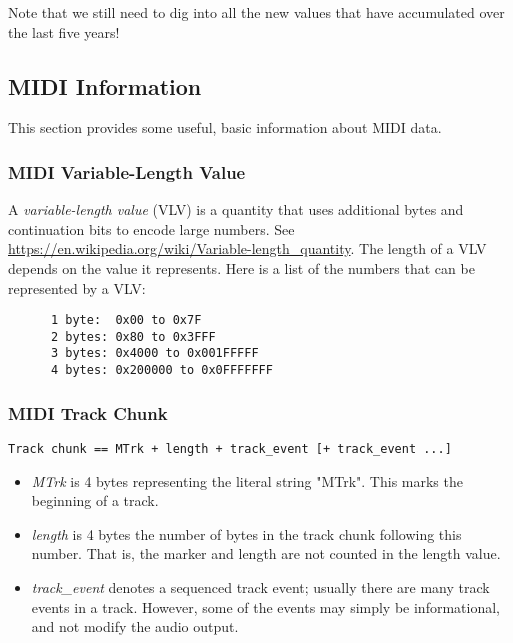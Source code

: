    Note that we still need to dig into all the new values that have accumulated
   over the last five years!

\subsection{MIDI Information}
\label{subsec:midi_information}

   This section provides some useful, basic information about MIDI data.

\subsubsection{MIDI Variable-Length Value}
\label{subsubsec:midi_variable_length_value}

   A \textsl{variable-length value} (VLV) is a quantity that uses additional
   bytes and continuation bits to encode large numbers.
   See \url{https://en.wikipedia.org/wiki/Variable-length\_quantity}.
   The length of a VLV depends on the value it represents.
   Here is a list of the numbers that can be represented by a VLV:

   \begin{verbatim}
      1 byte:  0x00 to 0x7F
      2 bytes: 0x80 to 0x3FFF
      3 bytes: 0x4000 to 0x001FFFFF
      4 bytes: 0x200000 to 0x0FFFFFFF
   \end{verbatim}

\subsubsection{MIDI Track Chunk}
\label{subsubsec:midi_track_chunk}

   \texttt{Track chunk == MTrk + length + track\_event [+ track\_event ...]}

   \begin{itemize}
      \item \textsl{MTrk} is 4 bytes representing the literal string "MTrk".
         This marks the beginning of a track.
      \item \textsl{length} is 4 bytes the number of bytes in the track
         chunk following this number.  That is, the marker and length are
         not counted in the length value.
      \item \textsl{track\_event} denotes a sequenced track event; usually
         there are many track events in a  track.  However, some of the
         events may simply be informational, and not modify the audio
         output.
   \end{itemize}

